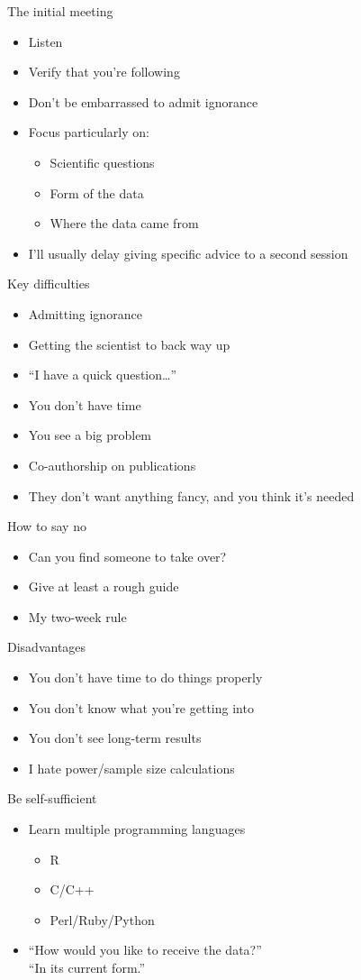 \documentclass[12pt,t]{beamer}
\newcommand{\bbi}{\vspace{24pt} \begin{itemize} \itemsep12pt}
\newcommand{\bi}{\begin{itemize}}
\newcommand{\ei}{\end{itemize}}
\begin{document}
\begin{frame}{The initial meeting}

\bbi
\item Listen
\item Verify that you're following
\item Don't be embarrassed to admit ignorance
\item Focus particularly on:
\bi
\item Scientific questions
\item Form of the data
\item Where the data came from
\ei
\item I'll usually delay giving specific advice to a second session
\ei
\end{frame}


\begin{frame}{Key difficulties}

\bbi
\item Admitting ignorance
\item Getting the scientist to back way up
\item ``I have a quick question\dots''
\item You don't have time
\item You see a big problem
\item Co-authorship on publications
\item They don't want anything fancy, and you think it's needed
\ei
\end{frame}

\begin{frame}{How to say no}

\bbi
\item Can you find someone to take over?
\item Give at least a rough guide
\item My two-week rule
\ei
\end{frame}

\begin{frame}{Disadvantages}

\bbi
\item You don't have time to do things properly
\item You don't know what you're getting into
\item You don't see long-term results
\item I hate power/sample size calculations
\ei
\end{frame}

\begin{frame}{Be self-sufficient}

\bbi
\item Learn multiple programming languages
\bi
\item R
\item C/C++
\item Perl/Ruby/Python
\ei
\item ``How would you like to receive the data?'' \\[12pt]
{\color{vhilight} ``In its current form.''}
\ei
\end{frame}
\end{document}

